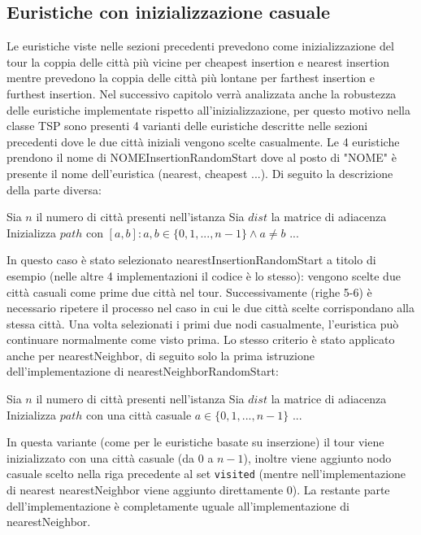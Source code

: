 \documentclass[a4paper,12pt]{report}
\begin{document}
\subsection{Euristiche con inizializzazione casuale}
Le euristiche viste nelle sezioni precedenti prevedono come inizializzazione del tour la coppia delle città più vicine per cheapest insertion e nearest insertion mentre prevedono la coppia delle città più lontane per farthest insertion e furthest insertion. Nel successivo capitolo verrà analizzata anche la robustezza delle euristiche implementate rispetto all'inizializzazione, per questo motivo nella classe TSP sono presenti 4 varianti delle euristiche descritte nelle sezioni precedenti dove le due città iniziali vengono scelte casualmente. Le 4 euristiche prendono il nome di NOMEInsertionRandomStart dove al posto di "NOME" è presente il nome dell'euristica (nearest, cheapest ...). Di seguito la descrizione della parte diversa:
\begin{tcolorbox}[colframe=black, colback=white, boxrule=0.5pt, title=Nearest Insertion Random Start, coltitle=black, fonttitle=\bfseries, colbacktitle=white, breakable]
  \begin{algorithmic}[1]
    \State Sia $n$ il numero di città presenti nell'istanza
    \State Sia $dist$ la matrice di adiacenza
    \State Inizializza $path$ con $[a, b] : a, b \in \{0, 1, ..., n - 1\} \land a \neq b$
    \State ...
  \end{algorithmic}
  \end{tcolorbox}
In questo caso è stato selezionato nearestInsertionRandomStart a titolo di esempio (nelle altre 4 implementazioni il codice è lo stesso): vengono scelte due città casuali come prime due città nel tour. Successivamente (righe 5-6) è necessario ripetere il processo nel caso in cui le due città scelte corrispondano alla stessa città. Una volta selezionati i primi due nodi casualmente, l'euristica può continuare normalmente come visto prima.
Lo stesso criterio è stato applicato anche per nearestNeighbor, di seguito solo la prima istruzione dell'implementazione di nearestNeighborRandomStart:
\begin{tcolorbox}[colframe=black, colback=white, boxrule=0.5pt, title=Nearest Neighbor Random Start, coltitle=black, fonttitle=\bfseries, colbacktitle=white, breakable]
  \begin{algorithmic}[1]
    \State Sia $n$ il numero di città presenti nell'istanza
    \State Sia $dist$ la matrice di adiacenza
    \State Inizializza $path$ con una città casuale $a \in \{0, 1, ..., n - 1\}$
    \State ...
  \end{algorithmic}
  \end{tcolorbox}
In questa variante (come per le euristiche basate su inserzione) il tour viene inizializzato con una città casuale (da 0 a $n - 1$), inoltre viene aggiunto nodo casuale scelto nella riga precedente al set \lstinline!visited! (mentre nell'implementazione di nearest nearestNeighbor viene aggiunto direttamente 0). La restante parte dell'implementazione è completamente uguale all'implementazione di nearestNeighbor.
\end{document}
